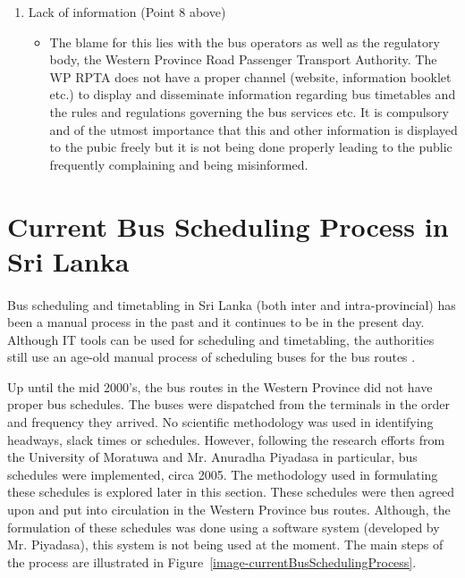 \begin {enumerate}
\begin {itemize}
\end {itemize}
\item Lack of information (Point 8 above)
\begin {itemize}
\item The blame for this lies with the bus operators as well as the regulatory body, the Western Province Road Passenger Transport Authority. The WP RPTA does not have a proper channel (website, information booklet etc.) to display and disseminate information regarding bus timetables and the rules and regulations governing the bus services etc. It is compulsory and of the utmost importance that this and other information is displayed to the pubic freely but it is not being done properly leading to the public frequently complaining and being misinformed.
\end {itemize}
\end {enumerate}

\section{Current Bus Scheduling Process in Sri Lanka}
\label{section-CurrentBusSchedulingProcessInSriLanka}

\paragraph{ } Bus scheduling and timetabling in Sri Lanka (both inter and intra-provincial) has been a manual process in the past and it continues to be in the present day. Although IT tools can be used for scheduling and timetabling, the authorities still use an age-old manual process of scheduling buses for the bus routes \cite{Mahesh2013a, Theja2013a, Mahesh2013a}.

Up until the mid 2000's, the bus routes in the Western Province did not have proper bus schedules. The buses were dispatched from the terminals in the order and frequency they arrived. No scientific methodology was used in identifying headways, slack times or schedules. However, following the research efforts from the University of Moratuwa and Mr. Anuradha Piyadasa in particular, bus schedules were implemented, circa 2005. The methodology used in formulating these schedules is explored later in this section. These schedules were then agreed upon and put into circulation in the Western Province bus routes. Although, the formulation of these schedules was done using a software system (developed by Mr. Piyadasa), this system is not being used at the moment. The main steps of the process are illustrated in Figure~\ref{image-currentBusSchedulingProcess}.

